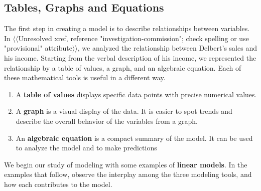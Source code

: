 \documentclass[10pt,]{book}
\newcommand{\terminology}[1]{\textbf{#1}}
\theoremstyle{plain}
\theoremstyle{definition}
\theoremstyle{definition}
\theoremstyle{definition}
\numberwithin{equation}{part}
\begin{document}
\subsection[{Tables, Graphs and Equations}]{Tables, Graphs and Equations}\label{subsection-1}
The first step in creating a model is to describe relationships between variables.  In {$\langle\langle$Unresolved xref, reference "investigation-commission"; check spelling or use "provisional" attribute$\rangle\rangle$}, we analyzed the relationship between Delbert's sales and his income.  Starting from the verbal description of his income, we represented the relationship by a table of values, a graph, and an algebraic equation.  Each of these mathematical tools is useful in a different way.%
\leavevmode%
\begin{enumerate}
\item\hypertarget{li-1}{}A \terminology{table of values} displays specific data points with precise numerical values.%
\item\hypertarget{li-2}{}A \terminology{graph} is a visual display of the data.  It is easier to spot trends and describe the overall behavior of the variables from a graph.%
\item\hypertarget{li-3}{}An \terminology{algebraic equation} is a compact summary of the model.  It can be used to analyze the model and to make predictions%
\end{enumerate}
We begin our study of modeling with some examples of \terminology{linear models}.  In the examples that follow, observe the interplay among the three modeling tools, and how each contributes to the model.%
\end{document}
